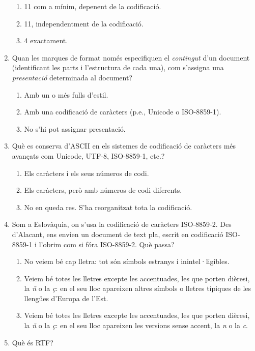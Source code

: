 \begin{enumerate}
\begin{enumerate}
\item 11 com a mínim, depenent de la codificació.
\item 11, independentment de la codificació.
\item 4 exactament.
\end{enumerate}
\item Quan les marques de format només especifiquen el
   \emph{contingut} d'un document (identificant les parts i
   l'estructura de cada una), com s'assigna una \emph{presentació}
   determinada al document?
   
\begin{enumerate}
\item Amb un o més fulls d'estil.
\item Amb una codificació de caràcters (p.e., Unicode o ISO-8859-1).
\item No s'hi pot assignar presentació.
\end{enumerate}
\item Què es conserva d'ASCII en els sistemes de codificació de
   caràcters més avançats com Unicode, UTF-8, ISO-8859-1, etc.?
   
\begin{enumerate}
\item Els caràcters i els seus números de codi.
\item Els caràcters, però amb números de codi diferents.
\item No en queda res. S'ha reorganitzat tota la codificació.
\end{enumerate}
\item Som a Eslovàquia, on s'usa la codificació de caràcters 
   ISO-8859-2. Des d'Alacant, ens envien un document de text pla,
   escrit en codificació ISO-8859-1 i l'obrim com si fóra
   ISO-8859-2. Què passa? 
   
\begin{enumerate}
\item No veiem bé cap lletra: tot són símbols estranys i inintel·ligibles.
\item Veiem bé totes
   les lletres excepte les accentuades, les que porten dièresi, la
   \emph{ñ} o la \emph{ç}: en el seu lloc apareixen altres símbols
   o lletres típiques de les llengües d'Europa de l'Est.
\item Veiem bé totes
   les lletres excepte les accentuades, les que porten dièresi, la
   \emph{ñ} o la \emph{ç}: en el seu lloc apareixen les versions
   sense accent, la \emph{n} o la \emph{c}.
\end{enumerate}
\item Què és RTF?
   

\end{enumerate}
